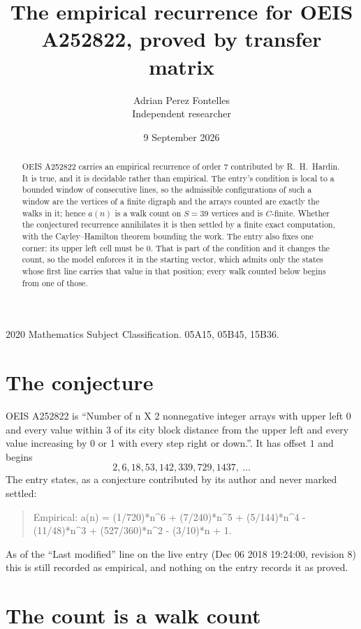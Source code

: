 \documentclass[11pt,a4paper]{article}
\title{The empirical recurrence for OEIS A252822, proved by transfer matrix}
\author{Adrian Perez Fontelles\\ \small Independent researcher}
\date{9 September 2026}
\theoremstyle{plain}
\theoremstyle{definition}
\begin{document}
\maketitle

\begin{abstract}
OEIS A252822 carries an empirical recurrence of order $7$ contributed by R.~H.~Hardin. It is
true, and it is decidable rather than empirical. The entry's condition is local to a bounded window of consecutive lines, so
the admissible configurations of such a window are the vertices of a finite digraph and the
arrays counted are exactly the walks in it; hence $a(n)$ is a walk count on $S=39$ vertices
and is $C$-finite. Whether the conjectured recurrence annihilates it is then settled by a
finite exact computation, with the Cayley--Hamilton theorem bounding the work.
 The entry also fixes one corner: its upper left cell must be $0$. That is part of the condition and it changes the count, so the model enforces it in the starting vector, which admits only the states whose first line carries that value in that position; every walk counted below begins from one of those.\end{abstract}

\noindent\small 2020 Mathematics Subject Classification. 05A15, 05B45, 15B36.\normalsize

\section{The conjecture}

OEIS A252822 is ``Number of n X 2 nonnegative integer arrays with upper left 0 and every value within 3 of its city block distance from the upper left and every value increasing by 0 or 1 with every step right or down.''. It has offset $1$ and begins
\[
2, 6, 18, 53, 142, 339, 729, 1437,\ \dots
\]
The entry states, as a conjecture contributed by its author and never marked settled:
\begin{quote}
Empirical: a(n) = (1/720)*n\^{}6 + (7/240)*n\^{}5 + (5/144)*n\^{}4 - (11/48)*n\^{}3 + (527/360)*n\^{}2 - (3/10)*n + 1.
\end{quote}
As of the ``Last modified'' line on the live entry (Dec 06 2018 19:24:00, revision 8) this is still
recorded as empirical, and nothing on the entry records it as proved.

\section{The count is a walk count}
\end{document}
